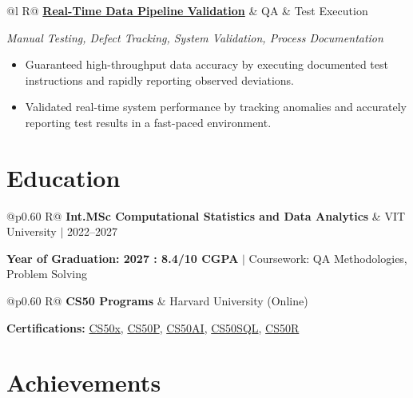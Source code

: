\documentclass[a4paper,10pt]{article}
\newcommand{\ulink}[2]{\href{#1}{#2}}
\newcommand{\subheading}[1]{{\color[HTML]{0A0A0A}\fontsize{12}{14}\selectfont\bfseries #1}}
\newcommand{\techstack}[1]{{\color[HTML]{5C5C5C}\fontsize{10.5}{12.5}\selectfont\itshape #1}}
\newcommand{\meta}[1]{{\color[HTML]{5C5C5C}\fontsize{10.5}{12.5}\selectfont #1}}
\begin{document}
\begin{tabularx}{\linewidth}{@{}l R@{}}
\subheading{\ulink{https://github.com/su-jin1425/Real-Time-Stock-Market-Data-Pipeline}{Real-Time Data Pipeline Validation}} & \meta{QA \& Test Execution}
\end{tabularx}
\techstack{Manual Testing, Defect Tracking, System Validation, Process Documentation}
\begin{itemize}[nosep, leftmargin=1.5em, itemsep=2pt, topsep=2pt]
  \item {\color[HTML]{0A0A0A}\fontsize{11}{14}\selectfont Guaranteed high-throughput data accuracy by executing documented test instructions and rapidly reporting observed deviations.}
  \item {\color[HTML]{0A0A0A}\fontsize{11}{14}\selectfont Validated real-time system performance by tracking anomalies and accurately reporting test results in a fast-paced environment.}
\end{itemize}

\section{Education}
\vspace{2pt}

\begin{tabularx}{\linewidth}{@{}p{0.60\linewidth} R@{}}
\subheading{Int.MSc Computational Statistics and Data Analytics} & \meta{VIT University $|$ 2022--2027}
\end{tabularx}
{\color[HTML]{3A3A3A}\fontsize{11}{14}\selectfont \textbf{Year of Graduation: 2027 : 8.4/10 CGPA} $|$ Coursework: QA Methodologies, Problem Solving}

\begin{tabularx}{\linewidth}{@{}p{0.60\linewidth} R@{}}
\subheading{CS50 Programs} & \meta{Harvard University (Online)}
\end{tabularx}
{\color[HTML]{3A3A3A}\fontsize{11}{14}\selectfont \textbf{Certifications:} \ulink{https://cs50.harvard.edu/certificates/b14b78df-e05c-413e-a607-1dd27303053a}{CS50x}, \ulink{https://cs50.harvard.edu/certificates/32477052-9db4-49c4-a5a4-d7e58429ca2c}{CS50P}, \ulink{https://cs50.harvard.edu/certificates/9cdb4d4a-1250-4f8e-9fd7-191864e0f919}{CS50AI}, \ulink{https://cs50.harvard.edu/certificates/bc486f24-f085-4e61-8536-80940b97a1b9}{CS50SQL}, \ulink{https://cs50.harvard.edu/certificates/666838e6-a053-4d82-b179-a60fe745fd84}{CS50R}}

\section{Achievements}
\vspace{2pt}
\end{document}
